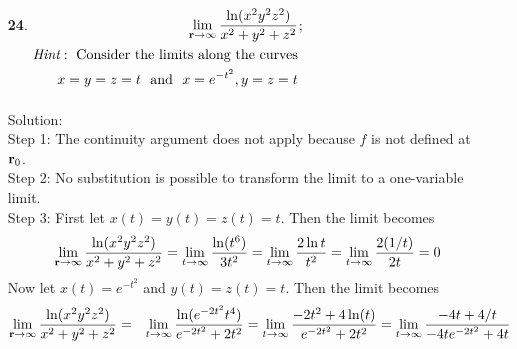 \documentclass[12pt]{amsbook}
\begin{document}
\begin{enumerate}
\\
{\sc Solution}:
\\
{\sf Step 1}: The continuity argument does not apply because $f$ is not defined at ${\bf r}_0$.
\\
{\sf Step 2}: No substitution is possible to transform the limit to a one-variable
limit.
\\
{\sf Step 3}: As a guess, consider $x(t)=t$, $y(t)=t$, and $z(t)=t$. Then the limit becomes
$$\lim_{{\bf r} \rightarrow {\bf 0}} \frac{x^2+2y^2+3z^2}{x^4+y^2z^4}=\lim_{t \rightarrow 0} \frac{6t^2}{t^4+t^6}=\lim_{t \rightarrow 0} \frac{6}{t^2+t^4}=\infty$$
\\
{\sf Step 4}: Suppose that $R=\sqrt{x^2+y^2+z^2}$. Then,
$$M<|f(x,y,z)|\leq \frac{|x|^2+2|y|^2+3|z|^2}{|x|^4+|y|^2|z|^4} \leq \frac{R^2+2R^2+3R^2}{R^4+R^6} \leq \frac{6R^2}{2R^6}=\frac{3}{R^4}$$
owing to the fact that for sufficiently small $R$.
And so we choose $R$ such that $M<3/(R^4)  \ \Leftrightarrow \ R<\sqrt[4]{3/M}$. Then if $\delta \leq \delta_1$ where $\delta_1$ is the smallest of $\sqrt[4]{3/M}$ and $1$, the values of $f$ for $0<\|{\bf r}\| < \delta$ will be larger than any preassigned positive number $M$.
\\
\item[{\small\bf 24}.] $\! \begin{aligned}[t]
\lim_{{\bf r} \rightarrow \infty} \frac{\ln(x^2y^2z^2)}{x^2+y^2+z^2}
\\
\textit{Hint}: \ \text{Consider the limits along the curves}
\\
x=y=z=t \ \ \text{and} \ \ x=e^{-t^2},y=z=t
\end{aligned}$;
\\
\\
{\sc Solution}:
\\
{\sf Step 1}: The continuity argument does not apply because $f$ is not defined at ${\bf r}_0$.
\\
{\sf Step 2}: No substitution is possible to transform the limit to a one-variable
limit.
\\
{\sf Step 3}: First let $x(t)=y(t)=z(t)=t$. Then the limit becomes
$$\lim_{{\bf r} \rightarrow \infty} \frac{\ln(x^2y^2z^2)}{x^2+y^2+z^2}=\lim_{t \rightarrow \infty} \frac{\ln(t^6)}{3t^2}=\lim_{t \rightarrow \infty} \frac{2\ln t}{t^2}=\lim_{t \rightarrow \infty} \frac{2(1/t)}{2t}=0$$
Now let $x(t)=e^{-t^2}$ and $y(t)=z(t)=t$. Then the limit becomes
\begin{eqnarray*}
\lim_{{\bf r} \rightarrow \infty} \frac{\ln(x^2y^2z^2)}{x^2+y^2+z^2}&=&\lim_{t \rightarrow \infty} \frac{\ln(e^{-2t^2}t^4)}{e^{-2t^2}+2t^2}=\lim_{t \rightarrow \infty} \frac{-2t^2+4\ln(t)}{e^{-2t^2}+2t^2}=\lim_{t \rightarrow \infty} \frac{-4t+4/t}{-4te^{-2t^2}+4t} \\

\end{eqnarray*}
\end{enumerate}
\end{document}
